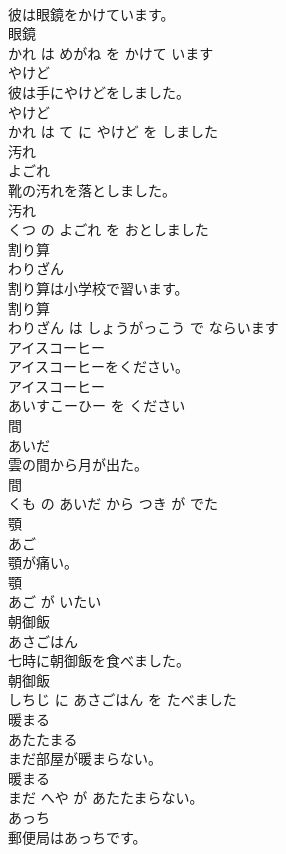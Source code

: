 \documentclass[8pt]{extreport}
\begin{document}
\begin{CJK}{UTF8}{min}
\\	彼は眼鏡をかけています。	
\\	眼鏡 
\\	かれ は めがね を かけて います			
\\	やけど	
\\	彼は手にやけどをしました。	
\\	やけど 
\\	かれ は て に やけど を しました			
\\	汚れ	
\\	よごれ			
\\	靴の汚れを落としました。	
\\	汚れ 
\\	くつ の よごれ を おとしました			
\\	割り算	
\\	わりざん			
\\	割り算は小学校で習います。	
\\	割り算 
\\	わりざん は しょうがっこう で ならいます			
\\	アイスコーヒー	
\\	アイスコーヒーをください。	
\\	アイスコーヒー 
\\	あいすこーひー を ください			
\\	間	
\\	あいだ			
\\	雲の間から月が出た。	
\\	間 
\\	くも の あいだ から つき が でた			
\\	顎	
\\	あご			
\\	顎が痛い。	
\\	顎 
\\	あご が いたい			
\\	朝御飯	
\\	あさごはん			
\\	七時に朝御飯を食べました。	
\\	朝御飯 
\\	しちじ に あさごはん を たべました			
\\	暖まる	
\\	あたたまる			
\\	まだ部屋が暖まらない。	
\\	暖まる 
\\	まだ へや が あたたまらない。			
\\	あっち	
\\	郵便局はあっちです。	

\end{CJK}
\end{document}
